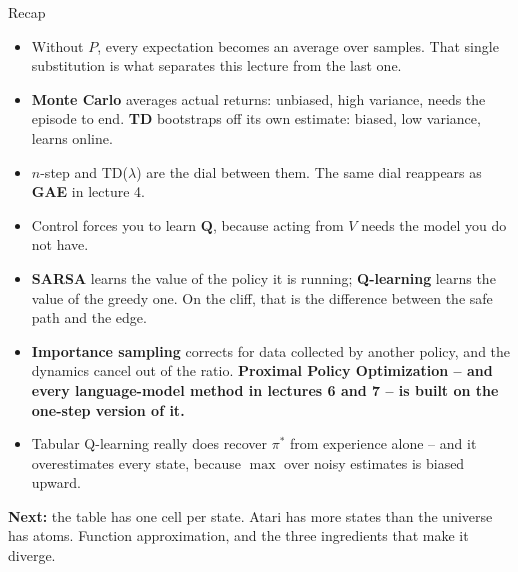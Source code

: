 \documentclass[aspectratio=169]{beamer}
\begin{document}
\begin{frame}{Recap}
  \footnotesize
  \begin{itemize}\itemsep4pt
    \item Without $P$, every expectation becomes an average over samples. That single
          substitution is what separates this lecture from the last one.
    \item \textbf{Monte Carlo} averages actual returns: unbiased, high variance, needs the
          episode to end. \textbf{TD} bootstraps off its own estimate: biased, low variance,
          learns online.
    \item $n$-step and TD($\lambda$) are the dial between them. The same dial reappears as
          \textbf{GAE} in lecture 4.
    \item Control forces you to learn $\mathbf{Q}$, because acting from $V$ needs the model you
          do not have.
    \item \textbf{SARSA} learns the value of the policy it is running; \textbf{Q-learning}
          learns the value of the greedy one. On the cliff, that is the difference between the
          safe path and the edge.
    \item \textbf{Importance sampling} corrects for data collected by another policy, and the
          dynamics cancel out of the ratio. \textbf{Proximal Policy Optimization -- and every
          language-model method in lectures 6 and 7 -- is built on the one-step version of it.}
    \item Tabular Q-learning really does recover $\pi^*$ from experience alone -- and it
          overestimates every state, because $\max$ over noisy estimates is biased upward.
  \end{itemize}

  \vskip 5pt
  \begin{tcolorbox}[colback=paramgreen!8, colframe=paramgreen, boxrule=0.6pt, arc=2pt]
    \footnotesize
    \textbf{Next:} the table has one cell per state. Atari has more states than the universe has
    atoms. Function approximation, and the three ingredients that make it diverge.
  \end{tcolorbox}
\end{frame}
\end{document}
